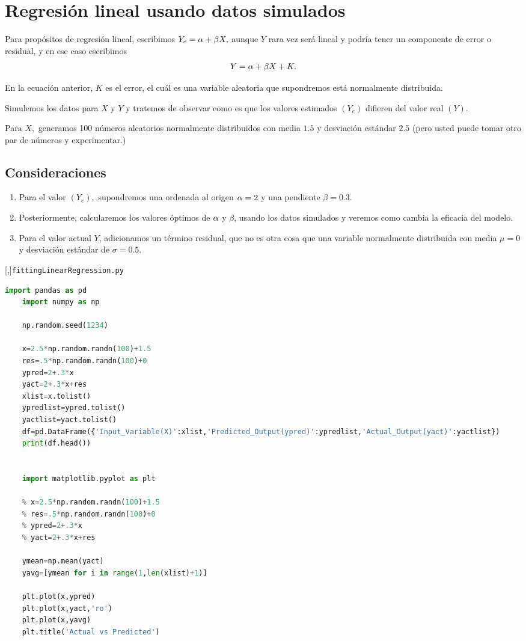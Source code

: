 \section{Regresión lineal usando datos simulados}

Para propósitos de regresión lineal, escribimos $Y_{e}=\alpha+\beta X,$ aunque $Y$ rara vez será lineal y podría tener un componente de error o residual, y en ese caso escribimos
\begin{align}
	Y=\alpha + \beta X + K.
\end{align}


En la ecuación anterior, $K$ es el error, el cuál es una variable aleatoria que supondremos está normalmente distribuida.


Simulemos los datos para $X$ y $Y$ y tratemos de observar como es que los valores estimados $\left( Y_{e} \right)$ difieren del valor real $\left( Y \right)$.


Para $X,$ generamos 100 números aleatorios normalmente distribuidos con media $1.5$ y desviación estándar $2.5$ (pero usted puede tomar otro par de números y experimentar.)


\subsection{Consideraciones}
\begin{enumerate}
	\item Para el valor $(Y_{e}),$ supondremos una ordenada al origen $\alpha=2$ y una pendiente $\beta=0.3$. 
	
	\item
	Posteriormente, calcularemos los valores óptimos de $\alpha$ y $\beta$, usando los datos simulados y veremos como cambia la eficacia del modelo.
	
	\item
	Para el valor actual $Y$, adicionamos un término residual, que no es otra cosa que una variable normalmente distribuida con media $\mu=0$ y desviación estándar de $\sigma=0.5$.
\end{enumerate}


[,]{\texttt{fittingLinearRegression.py}}
\begin{lstlisting}[language=Python]
	import pandas as pd
	import numpy as np
	
	np.random.seed(1234)
	
	x=2.5*np.random.randn(100)+1.5
	res=.5*np.random.randn(100)+0
	ypred=2+.3*x
	yact=2+.3*x+res
	xlist=x.tolist()
	ypredlist=ypred.tolist()
	yactlist=yact.tolist()
	df=pd.DataFrame({'Input_Variable(X)':xlist,'Predicted_Output(ypred)':ypredlist,'Actual_Output(yact)':yactlist})
	print(df.head())
	
	
	import matplotlib.pyplot as plt
	
	% x=2.5*np.random.randn(100)+1.5
	% res=.5*np.random.randn(100)+0
	% ypred=2+.3*x
	% yact=2+.3*x+res
	
	ymean=np.mean(yact)
	yavg=[ymean for i in range(1,len(xlist)+1)]
	
	plt.plot(x,ypred)
	plt.plot(x,yact,'ro')
	plt.plot(x,yavg)
	plt.title('Actual vs Predicted')
\end{lstlisting}

